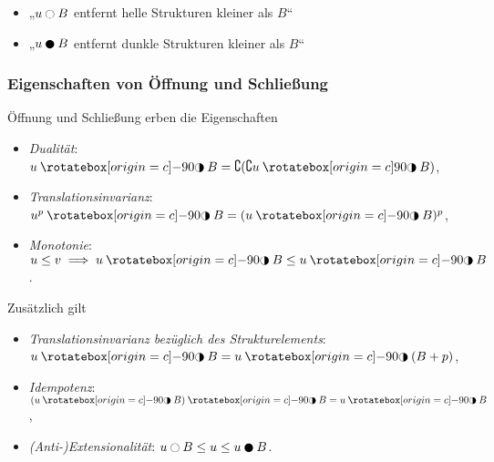 \documentclass{beamer}
\begin{document}
\begin{frame}
\begin{center}
    \end{center}
    \vspace{-1em}
    \begin{itemize}
        \item<4->
            „$u \open B$ entfernt helle Strukturen kleiner als $B$“
        \item<7->
            „$u \close B$ entfernt dunkle Strukturen kleiner als $B$“
    \end{itemize}
\end{frame}

\begin{frame}
    \frametitle{Eigenschaften von Öffnung und Schließung}
    \begin{lemma}
        Öffnung und Schließung erben die Eigenschaften
        \begin{itemize}
            \item \pause
                \emph{Dualität}: $u \openclose B = \complement (\complement u \closeopen B)$,
            \item \pause
                \emph{Translationsinvarianz}: $u^p \openclose B = (u \openclose B)^p$,
            \item \pause
                \emph{Monotonie}: $u \le v \implies u \openclose B \le u \openclose B$.
        \end{itemize}
        Zusätzlich gilt
        \begin{itemize}
            \item \pause
                \emph{Translationsinvarianz bezüglich des Strukturelements}: $u \openclose B = u \openclose (B + p)$,
            \item \pause
                \emph{Idempotenz}: $(u \openclose B) \openclose B = u \openclose B$,
            \item \pause
                \emph{(Anti-)Extensionalität}: $u \open B \le u \le u \close B$.
        \end{itemize}
    \end{lemma}
\end{frame}
\end{document}
